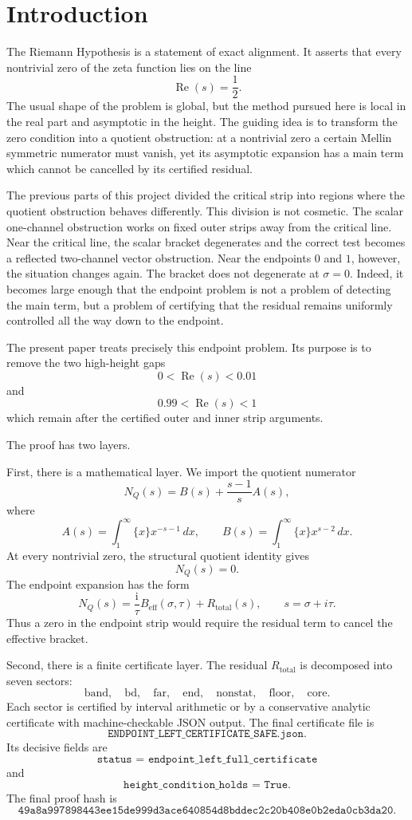 \documentclass[11pt]{article}
\DeclareMathOperator{\Rea}{Re}
\newcommand{\NQ}{N_Q}
\newcommand{\Beff}{B_{\mathrm{eff}}}
\newcommand{\Rtot}{R_{\mathrm{total}}}
\newcommand{\ii}{\mathrm{i}}
\begin{document}
\tableofcontents

\section{Introduction}

The Riemann Hypothesis is a statement of exact alignment.  It asserts that every nontrivial zero of the zeta function lies on the line
\[
\Rea(s)=\frac12.
\]
The usual shape of the problem is global, but the method pursued here is local in the real part and asymptotic in the height.  The guiding idea is to transform the zero condition into a quotient obstruction: at a nontrivial zero a certain Mellin symmetric numerator must vanish, yet its asymptotic expansion has a main term which cannot be cancelled by its certified residual.

The previous parts of this project divided the critical strip into regions where the quotient obstruction behaves differently.  This division is not cosmetic.  The scalar one-channel obstruction works on fixed outer strips away from the critical line.  Near the critical line, the scalar bracket degenerates and the correct test becomes a reflected two-channel vector obstruction.  Near the endpoints \(0\) and \(1\), however, the situation changes again.  The bracket does not degenerate at \(\sigma=0\).  Indeed, it becomes large enough that the endpoint problem is not a problem of detecting the main term, but a problem of certifying that the residual remains uniformly controlled all the way down to the endpoint.

The present paper treats precisely this endpoint problem.  Its purpose is to remove the two high-height gaps
\[
0<\Rea(s)<0.01
\]
and
\[
0.99<\Rea(s)<1
\]
which remain after the certified outer and inner strip arguments.

The proof has two layers.

First, there is a mathematical layer.  We import the quotient numerator
\[
\NQ(s)=B(s)+\frac{s-1}{s}A(s),
\]
where
\[
A(s)=\int_1^\infty \{x\}x^{-s-1}\,dx,
\qquad
B(s)=\int_1^\infty \{x\}x^{s-2}\,dx.
\]
At every nontrivial zero, the structural quotient identity gives
\[
\NQ(s)=0.
\]
The endpoint expansion has the form
\[
\NQ(s)=\frac{\ii}{\tau}\Beff(\sigma,\tau)+\Rtot(s),
\qquad
s=\sigma+i\tau.
\]
Thus a zero in the endpoint strip would require the residual term to cancel the effective bracket.

Second, there is a finite certificate layer.  The residual \(\Rtot\) is decomposed into seven sectors:
\[
\mathrm{band},
\quad
\mathrm{bd},
\quad
\mathrm{far},
\quad
\mathrm{end},
\quad
\mathrm{nonstat},
\quad
\mathrm{floor},
\quad
\mathrm{core}.
\]
Each sector is certified by interval arithmetic or by a conservative analytic certificate with machine-checkable JSON output.  The final certificate file is
\[
\texttt{ENDPOINT\_LEFT\_CERTIFICATE\_SAFE.json}.
\]
Its decisive fields are
\[
\texttt{status = endpoint\_left\_full\_certificate}
\]
and
\[
\texttt{height\_condition\_holds = True}.
\]
The final proof hash is
\[
\texttt{49a8a997898443ee15de999d3ace640854d8bddec2c20b408e0b2eda0cb3da20}.
\]
\end{document}

